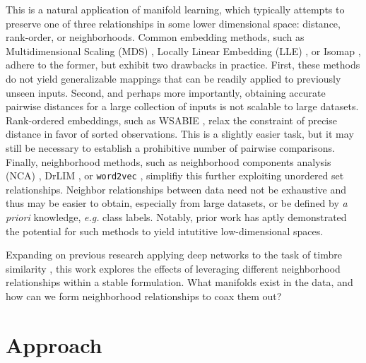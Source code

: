 \documentclass{article}
\begin{document}
This is a natural application of manifold learning, which typically attempts to preserve one of three relationships in some lower dimensional space: distance, rank-order, or neighborhoods.
Common embedding methods, such as Multidimensional Scaling (MDS) \cite{}, Locally Linear Embedding (LLE) \cite{}, or Isomap \cite{}, adhere to the former, but exhibit two drawbacks in practice.
First, these methods do not yield generalizable mappings that can be readily applied to previously unseen inputs.
Second, and perhaps more importantly, obtaining accurate pairwise distances for a large collection of inputs is not scalable to large datasets.
Rank-ordered embeddings, such as WSABIE \cite{weston2011wsabie}, relax the constraint of precise distance in favor of sorted observations.
This is a slightly easier task, but it may still be necessary to establish a prohibitive number of pairwise comparisons.
Finally, neighborhood methods, such as neighborhood components analysis (NCA) \cite{hinton2004neighborhood}, DrLIM \cite{hadsell2006drlim}, or \texttt{word2vec} \cite{mikolov2013distributed}, simplifiy this further exploiting unordered set relationships.
Neighbor relationships between data need not be exhaustive and thus may be easier to obtain, especially from large datasets, or be defined by \emph{a priori} knowledge, \emph{e.g.} class labels.
Notably, prior work has aptly demonstrated the potential for such methods to yield intutitive low-dimensional spaces.

Expanding on previous research applying deep networks to the task of timbre similarity \cite{humphrey2015dl4mir}, this work explores the effects of leveraging different neighborhood relationships within a stable formulation.
What manifolds exist in the data, and how can we form neighborhood relationships to coax them out?


\section{Approach}
\end{document}
